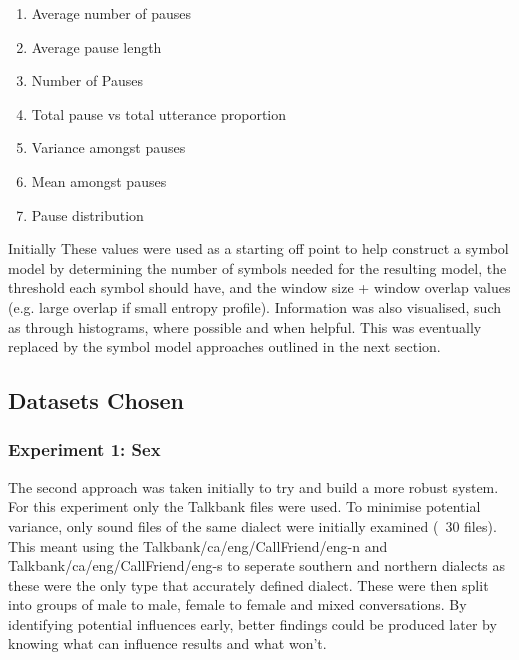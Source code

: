 \begin{enumerate}
\item Average number of pauses
\item Average pause length
\item Number of Pauses
\item Total pause vs total utterance proportion
\item Variance amongst pauses
\item Mean amongst pauses
\item Pause distribution
\end{enumerate}


Initially These values were used as a starting off point to help construct a symbol model by determining the number of symbols needed for the resulting model, the threshold each symbol should have, and the window size + window overlap values (e.g. large overlap if small entropy profile). Information was also visualised, such as through histograms, where possible and when helpful. This was eventually replaced by the symbol model approaches outlined in the next section.  \\



\subsection{Datasets Chosen}
\subsubsection{Experiment 1: Sex} 
The second approach was taken initially to try and build a more robust system. For this experiment only the Talkbank files were used. To minimise potential variance, only sound files of the same dialect were initially examined (~30 files). This meant using the Talkbank/ca/eng/CallFriend/eng-n and Talkbank/ca/eng/CallFriend/eng-s to seperate southern and northern dialects as these were the only type that accurately defined dialect. These were then split into groups of male to male, female to female and mixed conversations. By identifying potential influences early, better findings could be produced later by knowing what can influence results and what won't. \\

